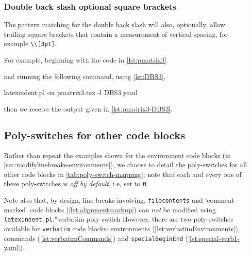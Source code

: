     \subsubsection{Double back slash optional square brackets}
    The pattern matching for the double back slash will also, optionally, allow trailing
    square brackets that contain a measurement of vertical spacing, for example \lstinline!\\[3pt]!. 

    For example, beginning with the code in \cref{lst:pmatrix3}


        and running the following command, using \cref{lst:DBS3},
	\begin{commandshell}
latexindent.pl -m pmatrix3.tex -l DBS3.yaml
            \end{commandshell}
            then we receive the output given in \cref{lst:pmatrix3-DBS3}.


\subsection{Poly-switches for other code blocks}
	Rather than repeat the examples shown for the environment code blocks (in
	\vref{sec:modifylinebreaks-environments}), we choose to detail the poly-switches for all other code
	blocks in \cref{tab:poly-switch-mapping}; note that each and every one of these
	poly-switches is \emph{off by default}, i.e, set to \texttt{0}.

    Note also that, by design, line breaks involving,
	\texttt{filecontents} and `comment-marked' code blocks
	(\vref{lst:alignmentmarkup}) can \emph{not} be modified using
	\texttt{latexindent.pl}.*{verbatim poly-switch} However, there are two poly-switches available for  \texttt{verbatim}
    code blocks: environments (\vref{lst:verbatimEnvironments}), commands (\vref{lst:verbatimCommands}) and \texttt{specialBeginEnd} (\vref{lst:special-verb1-yaml}).

